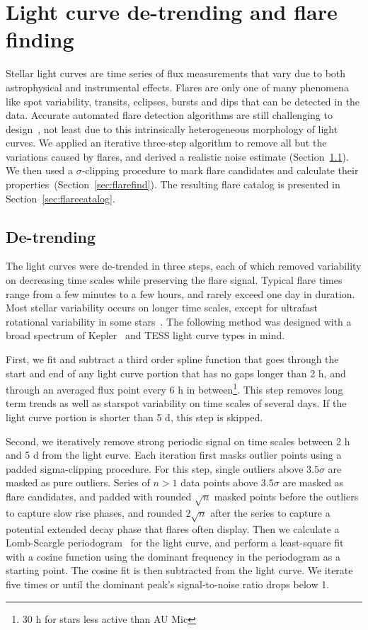 \documentclass[fleqn,usenatbib]{mnras}%
\begin{document}
\section{Light curve de-trending and flare finding}
\label{sec:detrendfind}
Stellar light curves are time series of flux measurements that vary due to both astrophysical and instrumental effects. Flares are only one of many phenomena like spot variability, transits, eclipses, bursts and dips that can be detected in the data. Accurate automated flare detection algorithms are still challenging to design~\citep{vida2021}, not least due to this intrinsically heterogeneous morphology of light curves. We applied an iterative three-step algorithm to remove all but the variations caused by flares, and derived a realistic noise estimate (Section~\ref{sec:detrend}). We then used a $\sigma$-clipping procedure to mark flare candidates and calculate their properties~(Section~\ref{sec:flarefind}). The resulting flare catalog is presented in Section~\ref{sec:flarecatalog}.

\subsection{De-trending}
\label{sec:detrend}
The light curves were de-trended in three steps, each of which removed variability on decreasing time scales while preserving the flare signal. Typical flare times range from a few minutes to a few hours, and rarely exceed one day in duration. Most stellar variability occurs on longer time scales, except for ultrafast rotational variability in some stars~\citep{ilin2021giant}. The following method was designed with a broad spectrum of Kepler~\citep{borucki2010} and TESS light curve types in mind. %

First, we fit and subtract a third order spline function that goes through the start and end of any light curve portion that has no gaps longer than 2 h, and through an averaged flux point every 6 h in between\footnote{30 h for stars less active than AU Mic}. This step removes long term trends as well as starspot variability on time scales of several days. If the light curve portion is shorter than 5 d, this step is skipped. 

Second, we iteratively remove strong periodic signal on time scales between 2 h and 5 d from the light curve. Each iteration first masks outlier points using a padded sigma-clipping procedure. For this step, single outliers above $3.5 \sigma$ are masked as pure outliers.  Series of $n>1$ data points above $3.5 \sigma$ are masked as flare candidates, and padded with rounded $\sqrt{n}$ masked points before the outliers to capture slow rise phases, and rounded $2\sqrt{n}$ after the series to capture a potential extended decay phase that flares often display. Then we calculate a Lomb-Scargle periodogram~\citep{lomb1976,scargle1982} for the light curve, and perform a least-square fit with a cosine function using the dominant frequency in the periodogram as a starting point. The cosine fit is then subtracted from the light curve. We iterate five times or until the dominant peak's signal-to-noise ratio drops below 1. 
\end{document}
